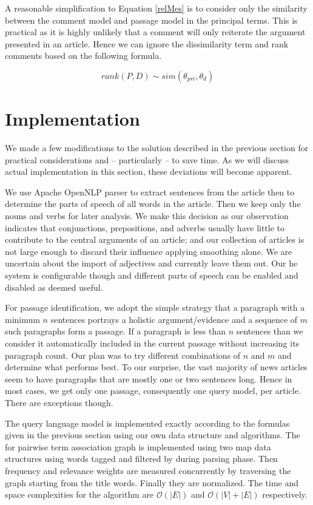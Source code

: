 \documentclass[article]{IEEEtran}
\begin{document}
A reasonable simplification to Equation \ref{relMes} is to consider only the similarity between the comment model and passage model in the principal terms. This is practical as it is highly unlikely that a comment will only reiterate the argument presented in an article. Hence we can ignore the dissimilarity term and rank comments based on the following formula.

\begin{equation}
\label{rank}
rank(P,D) \sim sim(\theta_{pri}, \theta_d)
\end{equation} 

\section{Implementation}
\label{si}
We made a few modifications to the solution described in the previous section for practical considerations and -- particularly -- to save time. As we will discuss actual implementation in this section, these deviations will become apparent.   

We use Apache OpenNLP parser \cite{openNLP} to extract sentences from the article then to determine the parts of speech of all words in the article. Then we keep only the nouns and verbs for later analysis. We make this decision as our observation indicates that conjunctions, prepositions, and adverbs usually have little to contribute to the central arguments of an article; and our collection of articles is not large enough to discard their influence applying smoothing alone. We are uncertain about the import of adjectives and currently leave them out. Our he system is configurable though and different parts of speech can be enabled and disabled as deemed useful.

For passage identification, we adopt the simple strategy that a paragraph with a minimum $n$ sentences portrays a holistic argument/evidence and a sequence of $m$ such paragraphs form a passage. If a paragraph is less than $n$ sentences than we consider it automatically included in the current passage without increasing its paragraph count. Our plan was to try different combinations of $n$ and $m$ and determine what performs best. To our surprise, the vast majority of news articles seem to have paragraphs that are mostly one or two sentences long. Hence in most cases, we get only one passage, consequently one query model, per article. There are exceptions though.                     

The query language model is implemented exactly according to the formulas given in the previous section using our own data structure and algorithms. The for pairwise term association graph is implemented using two map data structures using words tagged and filtered by during parsing phase. Then frequency and relevance weights are measured concurrently by traversing the graph starting from the title words. Finally they are normalized. The time and space complexities for the algorithm are $\mathcal{O}(|E|)$ and $\mathcal{O}(|V| + |E|)$ respectively.
\end{document}
